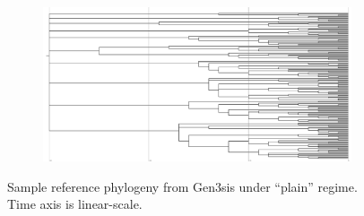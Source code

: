 \begin{figure}
\centering
\begin{subfigure}[b]{1\columnwidth}
\includegraphics[height=0.12\textheight,width=\textwidth]{img/gen3sis-species/model=gen3sis+taxon=species+treatment=plain+seed=1+phylogeny-snapshot-100000.pdf}
  \end{subfigure}
  \caption{%
    Sample reference phylogeny from Gen3sis under ``plain'' regime.
    Time axis is linear-scale.
  }
  \label{fig:perfect-tree-phylogeny-gen3sis}
\end{figure}
